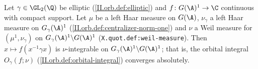 Let $\gamma\in\GL_2(\Q)$ be elliptic (\cref{II.orb.def:elliptic}) and $f\colon G(\A)^1\to\C$ continuous with compact support. Let $\mu$ be a left Haar
measure on $G(\A)$, $\nu_\gamma$ a left Haar measure on $G_\gamma(\A)^1$ (\cref{II.orb.def:centralizer-norm-one}) and $\nu$ a Weil measure for
$(\mu^1,\nu_\gamma)$ on $G_\gamma(\A)^1\backslash G(\A)^1$ (\texttt{X.quot.def:weil-measure}). Then $x\mapsto f(x^{-1}\gamma x)$ is $\nu$-integrable on
$G_\gamma(\A)^1\backslash G(\A)^1$; that is, the orbital integral $O_\gamma(f;\nu)$ (\cref{II.orb.def:orbital-integral}) converges absolutely.
